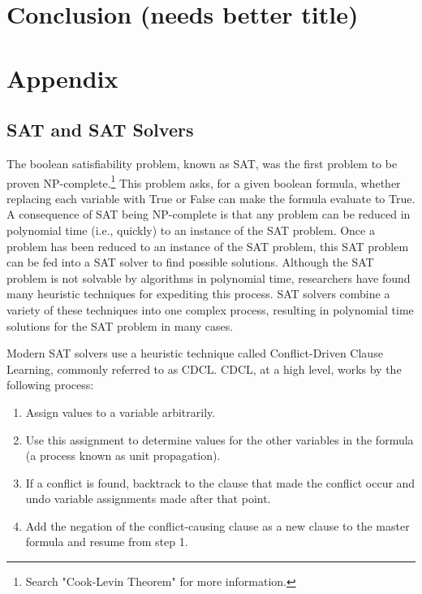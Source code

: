 \documentclass[jou,apacite]{apa6}
\begin{document}
\section{Conclusion (needs better title)}

\section{Appendix}

\subsection{SAT and SAT Solvers}

The boolean satisfiability problem, known as SAT, was the first problem to be proven NP-complete.\footnote{Search "Cook-Levin Theorem" for more information.} This problem asks, for a given boolean formula, whether replacing each variable with True or False can make the formula evaluate to True.   A consequence of SAT being NP-complete is that any problem can be reduced in polynomial time (i.e., quickly) to an instance of the SAT problem. Once a problem has been reduced to an instance of the SAT problem, this SAT problem can be fed into a SAT solver to find possible solutions. Although the SAT problem is not solvable by algorithms in polynomial time, researchers have found many heuristic techniques for expediting this process. SAT solvers combine a variety of these techniques into one complex process, resulting in polynomial time solutions for the SAT problem in many cases.

Modern SAT solvers use a heuristic technique called Conflict-Driven Clause Learning, commonly referred to as CDCL. CDCL, at a high level, works by the following process:

\begin{enumerate}

\item Assign values to a variable arbitrarily.
\item Use this assignment to determine values for the other variables in the formula (a process known as unit propagation).
\item If a conflict is found, backtrack to the clause that made the conflict occur and undo variable assignments made after that point.
\item Add the negation of the conflict-causing clause as a new clause to the master formula and resume from step 1.

\end{enumerate}
\end{document}
